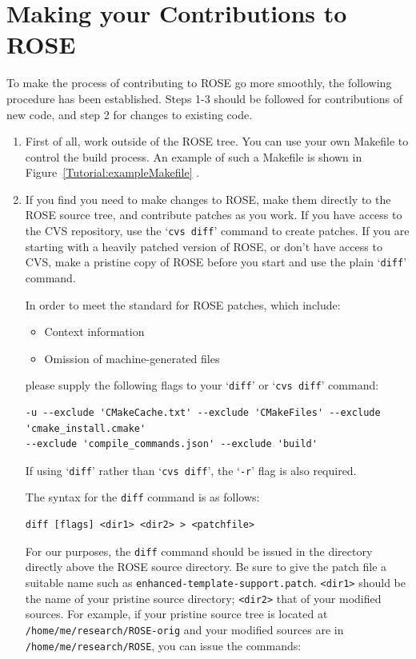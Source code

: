 \chapter{Making your Contributions to ROSE}

To make the process of contributing to ROSE go more smoothly, the following procedure has
been established.  Steps 1-3 should be followed for contributions of new code, and
step 2 for changes to existing code.

\begin{enumerate}
\item First of all, work outside of the ROSE tree.  You can use your own Makefile to control the build process.  An example of such a Makefile is shown in Figure~\ref{Tutorial:exampleMakefile} .

\item If you find you need to make changes to ROSE, make them directly to the ROSE source tree, and contribute patches as you work.  If you have access to the CVS repository, use the `\verb|cvs diff|' command to create patches.  If you are starting with a heavily patched version of ROSE, or don't have access to CVS, make a pristine copy of ROSE before you start and use the plain `\verb|diff|' command.

In order to meet the standard for ROSE patches, which include:
\begin{itemize}
\item Context information
\item Omission of machine-generated files
\end{itemize}
please supply the following flags to your `\verb|diff|' or `\verb|cvs diff|' command:

\begin{verbatim}
-u --exclude 'CMakeCache.txt' --exclude 'CMakeFiles' --exclude 'cmake_install.cmake'
--exclude 'compile_commands.json' --exclude 'build'
\end{verbatim}

If using `\verb|diff|' rather than `\verb|cvs diff|', the `\verb|-r|' flag is also required.

The syntax for the \verb|diff| command is as follows:

\begin{verbatim}
diff [flags] <dir1> <dir2> > <patchfile>
\end{verbatim}

For our purposes, the \verb|diff| command should be issued in the directory directly above the ROSE source directory.  Be sure to give the patch file a suitable name such as \verb|enhanced-template-support.patch|.  \verb|<dir1>| should be the name of your pristine source directory; \verb|<dir2>| that of your modified sources.  For example, if your pristine source tree is located at \verb|/home/me/research/ROSE-orig| and your modified sources are in \verb|/home/me/research/ROSE|, you can issue the commands:


\end{enumerate}
